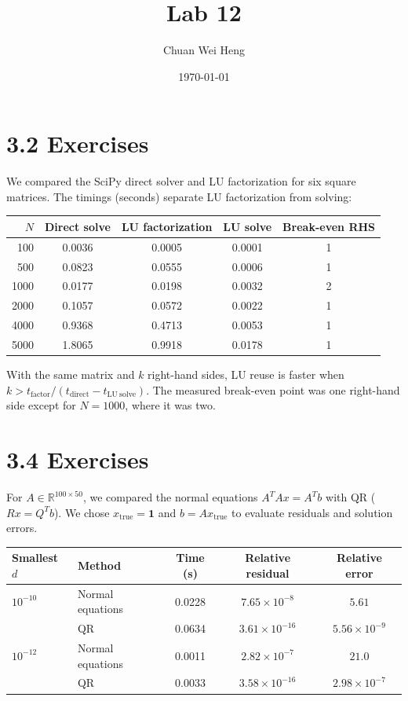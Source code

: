 \documentclass[11pt]{article}
\title{Lab 12}
\author{Chuan Wei Heng}
\date{\today}
\begin{document}
\maketitle
\vspace{-1.6em}

\section*{3.2 Exercises}

We compared the SciPy direct solver and LU factorization for six square
matrices. The timings (seconds) separate LU factorization from solving:

\begin{center}
\small
\begin{tabular}{rcccc}
\toprule
$N$ & Direct solve & LU factorization & LU solve & Break-even RHS \\
\midrule
100  & 0.0036 & 0.0005 & 0.0001 & 1 \\
500  & 0.0823 & 0.0555 & 0.0006 & 1 \\
1000 & 0.0177 & 0.0198 & 0.0032 & 2 \\
2000 & 0.1057 & 0.0572 & 0.0022 & 1 \\
4000 & 0.9368 & 0.4713 & 0.0053 & 1 \\
5000 & 1.8065 & 0.9918 & 0.0178 & 1 \\
\bottomrule
\end{tabular}
\end{center}

With the same matrix and $k$ right-hand sides, LU reuse is faster when
$k>t_{\mathrm{factor}}/(t_{\mathrm{direct}}-t_{\mathrm{LU\ solve}})$.
The measured break-even point was one right-hand side except for
$N=1000$, where it was two.

\section*{3.4 Exercises}

For $A\in\mathbb{R}^{100\times50}$, we compared the normal equations
$A^TAx=A^Tb$ with QR ($Rx=Q^Tb$). We chose $x_{\mathrm{true}}=\mathbf{1}$
and $b=Ax_{\mathrm{true}}$ to evaluate residuals and solution errors.

\begin{center}
\small
\begin{tabular}{llccc}
\toprule
Smallest $d$ & Method & Time (s) & Relative residual & Relative error \\
\midrule
$10^{-10}$ & Normal equations & 0.0228 & $7.65\times10^{-8}$ & $5.61$ \\
           & QR               & 0.0634 & $3.61\times10^{-16}$ & $5.56\times10^{-9}$ \\
$10^{-12}$ & Normal equations & 0.0011 & $2.82\times10^{-7}$ & $21.0$ \\
           & QR               & 0.0033 & $3.58\times10^{-16}$ & $2.98\times10^{-7}$ \\
\bottomrule
\end{tabular}
\end{center}
\end{document}
